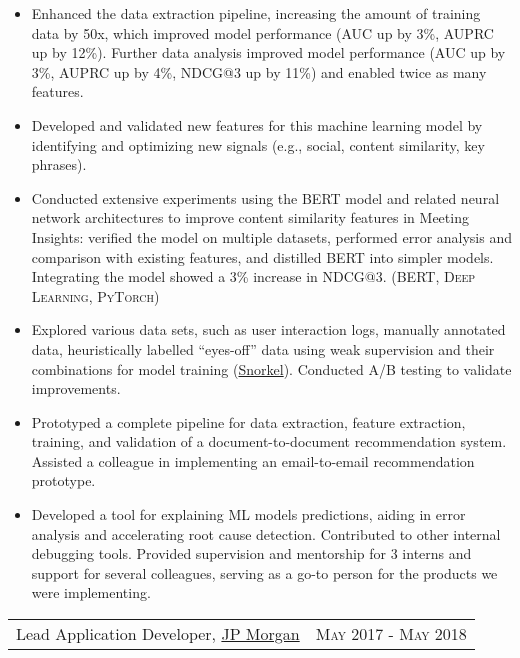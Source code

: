 \documentclass{article}
\makeatletter
\newcommand{\whatwherewhen}[3]{
\noindent\begin{tabular*}{\columnwidth}{@{}@{\extracolsep{\fill}}lr@{}}
#1, #2 & \textsc{#3}
\end{tabular*}}
\newcommand{\smallvskip}{\vskip2mm}
\newcommand{\mytexttilde}{\raisebox{0.5ex}{\texttildelow}}
\makeatother
\begin{document}
\begin{itemize}
\begin{itemize}
  \item Enhanced the data extraction pipeline, increasing the amount of training data by \mytexttilde 50x, which improved model performance (AUC up by 3\%, AUPRC up by 12\%). Further data analysis improved model performance (AUC up by 3\%, AUPRC up by 4\%, NDCG@3 up by 11\%) and enabled twice as many features.

  \item Developed and validated new features for this machine learning model by identifying and optimizing new signals (e.g., social, content similarity, key phrases).

  \item Conducted extensive experiments using the \textsc{BERT} model and related neural network architectures to improve content similarity features in Meeting Insights: verified the model on multiple datasets, performed error analysis and comparison with existing features, and distilled BERT into simpler models. Integrating the model showed a 3\% increase in NDCG@3. (\textsc{BERT}, \textsc{Deep Learning}, \textsc{PyTorch})

  \item Explored various data sets, such as user interaction logs, manually annotated data, heuristically labelled ``eyes-off'' data using weak supervision and their combinations for model training (\href{https://snorkel.ai/}{Snorkel}). Conducted A/B testing to validate improvements.

  \item Prototyped a complete pipeline for data extraction, feature extraction, training, and validation of a document-to-document recommendation system. Assisted a colleague in implementing an email-to-email recommendation prototype.

  \item Developed a tool for explaining ML models predictions, aiding in error analysis and accelerating root cause detection. Contributed to other internal debugging tools. Provided supervision and mentorship for 3 interns and support for several colleagues, serving as a go-to person for the products we were implementing.

  \end{itemize}

\end{itemize}


\smallvskip
\whatwherewhen{Lead Application Developer}{\href{https://www.jpmorganchase.com/}{JP Morgan}}{May 2017 - May 2018}
\end{document}
